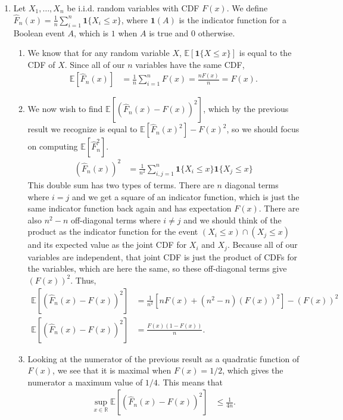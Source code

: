 \documentclass[11pt,letterpaper]{article}
\numberwithin{equation}{section}
\numberwithin{figure}{section}
\begin{document}
\begin{enumerate}
	\item Let $X_1,\ldots,X_n$ be i.i.d. random variables with CDF $F(x)$. We define ${\hat{F}_n(x) = \frac{1}{n} \sum_{i=1}^n \bm{1}\{X_i \leq x\}}$, where $\bm{1}(A)$ is the indicator function for a Boolean event $A$, which is $1$ when $A$ is true and $0$ otherwise.
	\begin{enumerate}
		\item We know that for any random variable $X$, $\mathbb{E}[\bm{1}\{X\leq x\}]$ is equal to the CDF of $X$. Since all of our $n$ variables have the same CDF,
		\begin{align*}
			\mathbb{E}[\hat{F}_n(x)] &= \frac{1}{n} \sum_{i=1}^n F(x) = \frac{n F(x)}{n} = F(x).
		\end{align*}

		\item We now wish to find $\mathbb{E}[(\hat{F}_n(x) - F(x))^2]$, which by the previous result we recognize is equal to $\mathbb{E}[\hat{F}_n(x)^2] - F(x)^2$, so we should focus on computing $\mathbb{E}[\hat{F}_n^2]$.
		\begin{align*}
			\left(\hat{F}_n(x)\right)^2 &= \frac{1}{n^2} \sum_{i,j=1}^n \bm{1}\{X_i\leq x\}\bm{1}\{X_j\leq x\}
		\end{align*}
		This double sum has two types of terms. There are $n$ diagonal terms where $i=j$ and we get a square of an indicator function, which is just the same indicator function back again and has expectation $F(x)$. There are also ${n^2-n}$ off-diagonal terms where $i\neq j$ and we should think of the product as the indicator function for the event $(X_i \leq x) \cap (X_j \leq x)$ and its expected value as the joint CDF for $X_i$ and $X_j$. Because all of our variables are independent, that joint CDF is just the product of CDFs for the variables, which are here the same, so these off-diagonal terms give $\left(F(x)\right)^2$. Thus,
		\begin{align*}
			\mathbb{E}[(\hat{F}_n(x) - F(x))^2] &= \frac{1}{n^2}\left[ nF(x) + (n^2-n)\left(F(x)\right)^2\right] - \left(F(x)\right)^2\\
			\mathbb{E}[(\hat{F}_n(x) - F(x))^2] &= \frac{F(x)\left(1-F(x)\right)}{n}.
		\end{align*}



		\item Looking at the numerator of the previous result as a quadratic function of $F(x)$, we see that it is maximal when $F(x) = 1/2$, which gives the numerator a maximum value of $1/4$. This means that
		\begin{align*}
			\sup_{x\in\mathbb{R}} \mathbb{E}\left[\left(\hat{F}_n(x)-F(x)\right)^2\right] & \leq \frac{1}{4n}.
		\end{align*}
	\end{enumerate}
\end{enumerate}
\end{document}
